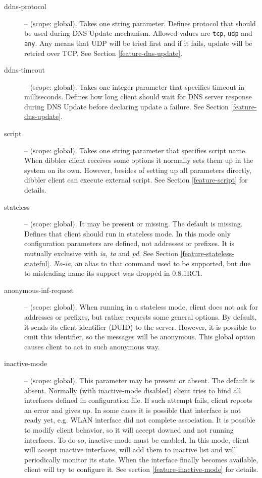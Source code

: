 \begin{description}
\item[ddns-protocol] -- (scope: global). Takes one string
parameter. Defines protocol that should be used during DNS Update
mechanism. Allowed values are \verb+tcp+, \verb+udp+ and \verb+any+.
Any means that UDP will be tried first and if it fails, update will be
retried over TCP. See Section \ref{feature-dns-update}.

\item[ddns-timeout] -- (scope: global). Takes one integer parameter
that specifies timeout in milliseconds. Defines how long client should
wait for DNS server response during DNS Update before declaring
update a failure. See Section \ref{feature-dns-update}.

\item[script] -- (scope: global). Takes one string parameter that
  specifies script name. When dibbler client receives some options it normally
  sets them up in the system on its own. However, besides of setting up all
  parameters directly, dibbler client can execute external
  script. See Section \ref{feature-script} for details.

\item[stateless] -- (scope: global). It may be present or missing. The
  default is missing. Defines that client should run in stateless
  mode. In this mode only configuration parameters are defined, not
  addresses or prefixes. It is mutually exclusive
  with \emph{ia}, \emph{ta} and \emph{pd}. See
  Section \ref{feature-stateless-stateful}. \emph{No-ia}, an alias to that
  command used to be supported, but due to misleading name its support
  was dropped in 0.8.1RC1.


\item[anonymous-inf-request] -- (scope: global). When running in a
  stateless mode, client does not ask for addresses or prefixes, but
  rather requests some general options. By default, it sends its
  client identifier (DUID) to the server. However, it is possible to
  omit this identifier, so the  messages will be
  anonymous. This global option causes client to act in such anonymous
  way.

 \item[inactive-mode] -- (scope: global). This parameter may be
   present or absent. The default is absent. Normally (with
   inactive-mode disabled) client tries to bind all interfaces defined
   in configuration file. If such attempt fails, client reports an
   error and gives up. In some cases it is possible that interface is
   not ready yet, e.g. WLAN interface did not complete association. It
   is possible to modify client behavior, so it will accept downed and
   not running interfaces. To do so, inactive-mode must be enabled. In
   this mode, client will accept inactive interfaces, will add them to
   inactive list and will periodically monitor its state. When the
   interface finally becomes available, client will try to configure
   it. See section \ref{feature-inactive-mode} for details.


\end{description}
